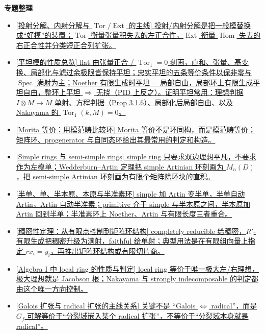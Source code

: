 \documentclass[a4paper]{ctexart}
\theoremstyle{definition}
\theoremstyle{analysis}
\theoremstyle{plain}
\begin{document}
\vspace{0.8em}
\noindent\textbf{专题整理}

\begin{itemize}
  \item \hyperref[subsec:topic-derived-functors]{[投射分解、内射分解与 \(\operatorname{Tor}/\operatorname{Ext}\) 的主线] 投射/内射分解是把一般模替换成“好模”的装置；\(\operatorname{Tor}\) 衡量张量积失去的左正合性，\(\operatorname{Ext}\) 衡量 \(\operatorname{Hom}\) 失去的右正合性并分类短正合列扩张。}
  \item \hyperref[subsec:topic-flat-modules]{[平坦模的性质总览] flat 由张量正合 / \(\operatorname{Tor}_1=0\) 刻画，直和、张量、基变换、局部化与滤过余极限皆保持平坦；忠实平坦的五条等价条件以保非零与 \(\operatorname{Spec}\) 满射为主；Noether 有限生成时平坦 = 局部自由，局部环上有限生成平坦自由，整环上平坦 \(\Rightarrow\) 无挠（PID 上反之）。证明平坦常用：理想判据 \(I\otimes M\to M\) 单射、方程判据（Prop 3.1.6）、局部化后局部自由、以及 Nakayama 的 \(\operatorname{Tor}_1(k,M)=0\)。}
  \item \hyperref[subsec:topic-morita-equivalence]{[Morita 等价：用模范畴比较环] Morita 等价不是环同构，而是模范畴等价；矩阵环、progenerator 与自同态环给出其最常用的判定和构造。}
  \item \hyperref[subsec:topic-simple-semisimple-rings]{[Simple rings 与 semi-simple rings] simple ring 只要求双边理想平凡，不要求作为左模单；Wedderburn--Artin 定理把 simple Artinian 环刻画为 \(M_n(D)\)，把 semi-simple Artinian 环刻画为有限个矩阵除环块的直积。}
  \item \hyperref[subsec:topic-simple-primitive-spectrum]{[半单、单、半本原、本原与半准素环] simple 加 Artin 变半单，半单自动 Artin，Artin 自动半准素；primitive 介于 simple 与半本原之间，半本原加 Artin 回到半单；半准素环上 Noether、Artin 与有限长度三者重合。}
  \item \hyperref[subsec:topic-density-theorem]{[稠密性定理：从有限点控制到矩阵环结构] completely reducible 给稠密，\(R'\)-有限生成把稠密升级为满射，faithful 给单射；典型用法是在有限组向量上指定 \(rx_i=y_i\)，再推出矩阵环结构或有限切片商。}
  \item \hyperref[subsec:topic-local-ring-algebra1]{[Algebra I 中 local ring 的性质与判定] local ring 等价于唯一极大左/右理想，极大理想就是 Jacobson 根；Nakayama 与 strongly indecomposable 的判定都由这个唯一方向控制。}
  \item \hyperref[subsec:topic-galois-radical]{[Galois 扩张与 radical 扩张的主线关系] 关键不是 “Galois \(\Leftrightarrow\) radical”，而是 \(G_f\) 可解等价于“分裂域嵌入某个 radical 扩张”，不等价于“分裂域本身就是 radical”。}

\end{itemize}
\end{document}
